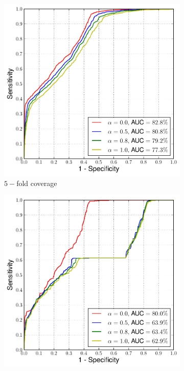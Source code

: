  \begin{figure}[t]
\centering
\begin{subfigure}{.33\textwidth}
  \centering
  \includegraphics[width=\linewidth]{Figure6-5fold-a}
  \caption{$5-$fold coverage}
\end{subfigure}%
\begin{subfigure}{.33\textwidth}
  \centering
  \includegraphics[width=\linewidth]{Figure7-10fold-a}

\end{subfigure}
\end{figure}
